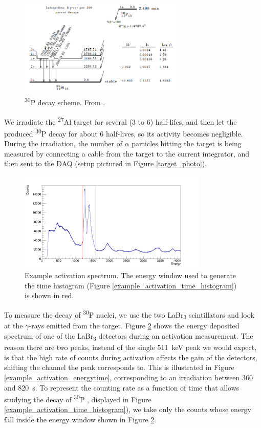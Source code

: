 \documentclass[a4paper,12pt]{report}
\newcommand{\Aliso}{\textsuperscript{27}Al }
\newcommand{\Piso}{\textsuperscript{30}P }
\begin{document}
\begin{figure}[H]
	\centering
	\includegraphics[width=0.7\textwidth]{Piso_decay_scheme.png}
	\caption{\Piso decay scheme.
	From \cite{nucleardatasheets}.}
	\label{Piso_decay_scheme}
\end{figure}

We irradiate the \Aliso target for several (3 to 6) half-lifes, and then let the produced \Piso decay for about 6 half-lives, so its activity becomes negligible.
During the irradiation, the number of $\alpha$ particles hitting the target is being measured by connecting a cable from the target to the current integrator, and then sent to the DAQ (setup pictured in Figure \ref{target_photo}).

\begin{figure}[H]
	\centering
	\includegraphics[width=0.80\textwidth]{example_activation_energy_histogram.png}
	\caption{Example activation spectrum.
	The energy window used to generate the time histogram (Figure \ref{example_activation_time_histogram}) is shown in red.}	%
	\label{example_activation_energy_histogram}
\end{figure}

To measure the decay of \Piso nuclei, we use the two LaBr\textsubscript{3} scintillators and look at the $\gamma$-rays emitted from the target.
Figure \ref{example_activation_energy_histogram} shows the energy deposited spectrum of one of the LaBr\textsubscript{3} detectors during an activation measurement.
The reason there are two peaks, instead of the single \qty{511}{\keV} peak we would expect, is that the high rate of counts during activation affects the gain of the detectors, shifting the channel the peak corresponds to.
This is illustrated in Figure \ref{example_activation_energytime}, corresponding to an irradiation between 360 and \qty{820}{\s}.
To represent the counting rate as a function of time that allows studying the decay of \Piso, displayed in Figure \ref{example_activation_time_histogram}), we take only the counts whose energy fall inside the energy window shown in Figure \ref{example_activation_energy_histogram}.
\end{document}
